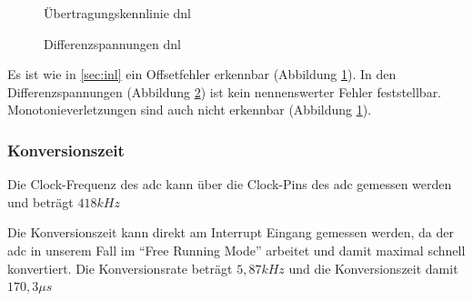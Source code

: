 \documentclass[12pt, a4paper, ngerman]{article}
\begin{document}
\begin{figure}%
  \caption{Übertragungskennlinie \ac{dnl}}
  \label{plot:dnl}
\end{figure}

\begin{figure}%
  \caption{Differenzspannungen \ac{dnl}}
  \label{plot:diff2}
\end{figure}

Es ist wie in \ref{sec:inl} ein Offsetfehler erkennbar (Abbildung \ref{plot:dnl}).
In den Differenzspannungen (Abbildung \ref{plot:diff2}) ist kein nennenswerter Fehler feststellbar.
Monotonieverletzungen sind auch nicht erkennbar (Abbildung \ref{plot:dnl}).

\subsubsection{Konversionszeit}

Die Clock-Frequenz des \ac{adc} kann über die Clock-Pins des \ac{adc} gemessen werden und beträgt $418kHz$

Die Konversionszeit kann direkt am Interrupt Eingang gemessen werden,
da der \ac{adc} in unserem Fall im \enquote{Free Running Mode} arbeitet
und damit maximal schnell konvertiert.
Die Konversionsrate beträgt $5,87kHz$ und die Konversionszeit damit $170,3\mu s$
\end{document}
